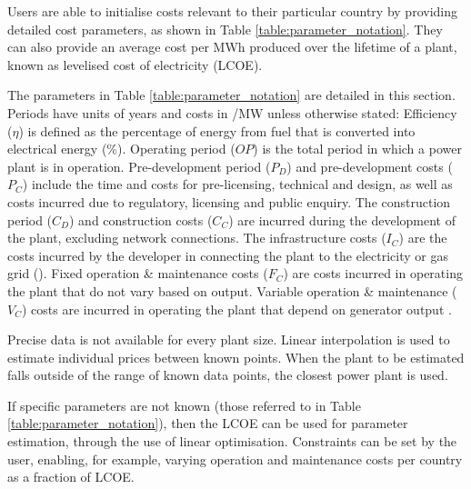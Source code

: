 Users are able to initialise costs relevant to their particular country by providing detailed cost parameters, as shown in Table \ref{table:parameter_notation}. They can also provide an average cost per MWh produced over the lifetime of a plant, known as levelised cost of electricity (LCOE).

The parameters in Table \ref{table:parameter_notation} are detailed in this section. Periods have units of years and costs in \textsterling/MW unless otherwise stated: Efficiency ($\eta$) is defined as the percentage of energy from fuel that is converted into electrical energy (\%). Operating period ($OP$) is the total period in which a power plant is in operation. Pre-development period ($P_D$) and pre-development costs ($P_C$) include the time and costs for pre-licensing, technical and design, as well as costs incurred due to regulatory, licensing and public enquiry. The construction period ($C_D$) and construction costs ($C_C$) are incurred during the development of the plant, excluding network connections. The infrastructure costs ($I_C$) are the costs incurred by the developer in connecting the plant to the electricity or gas grid (\textsterling). Fixed operation \& maintenance costs ($F_C$) are costs incurred in operating the plant that do not vary based on output. Variable operation \& maintenance ($V_C$) costs are incurred in operating the plant that depend on generator output \cite{Ltd2016}.




Precise data is not available for every plant size. Linear interpolation is used to estimate individual prices between known points. When the plant to be estimated falls outside of the range of known data points, the closest power plant is used. %

If specific parameters are not known (those referred to in Table \ref{table:parameter_notation}), then the LCOE can be used for parameter estimation, through the use of linear optimisation. Constraints can be set by the user, enabling, for example, varying operation and maintenance costs per country as a fraction of LCOE.

